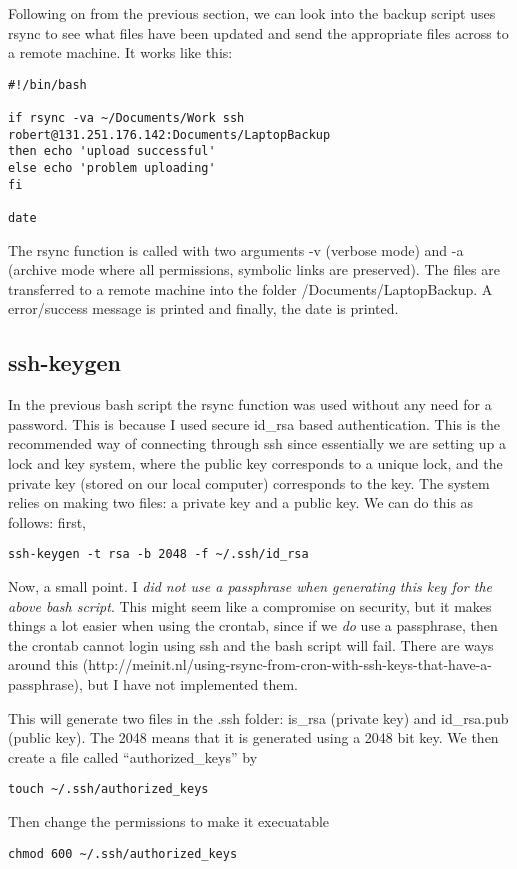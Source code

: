 \documentclass[a4paper, 10pt]{article}
\begin{document}
Following on from the previous section, we can look into the backup script uses rsync to see what files have been updated and send the appropriate files across to a remote machine. It works like this:
\begin{Verbatim}
#!/bin/bash

if rsync -va ~/Documents/Work ssh robert@131.251.176.142:Documents/LaptopBackup
then echo 'upload successful'
else echo 'problem uploading'
fi

date
\end{Verbatim}
The rsync function is called with two arguments -v (verbose mode) and -a (archive mode where all permissions, symbolic links are preserved). The files are transferred to a remote machine into the folder /Documents/LaptopBackup. A error/success message is printed and finally, the date is printed. 


\subsection*{ssh-keygen}

In the previous bash script the rsync function was used without any
need for a password. This is because I used secure id\_rsa based
authentication. This is the recommended way of connecting through ssh
since essentially we are setting up a lock and key system, where the
public key corresponds to a unique lock, and the private key (stored
on our local computer) corresponds to the key. The system relies on making two files:  a private key and a public key. We can do this as follows: first, 
\begin{verbatim}
ssh-keygen -t rsa -b 2048 -f ~/.ssh/id_rsa
\end{verbatim}
Now, a small point. I \emph{did not use a passphrase when generating this key for the above bash script}. This might seem like a compromise on security, but it makes things a lot easier when using the crontab, since if we \emph{do} use a passphrase, then the crontab cannot login using ssh and the bash script will fail. There are ways around this (http://meinit.nl/using-rsync-from-cron-with-ssh-keys-that-have-a-passphrase), but I have not implemented them.

This will generate two files in the .ssh folder: is\_rsa (private key) and id\_rsa.pub (public key). The 2048 means that it is generated using a 2048 bit key. We then create a file called ``authorized\_keys'' by 
\begin{verbatim}
touch ~/.ssh/authorized_keys
\end{verbatim}
Then change the permissions to make it execuatable
\begin{verbatim}
chmod 600 ~/.ssh/authorized_keys
\end{verbatim}
\end{document}
